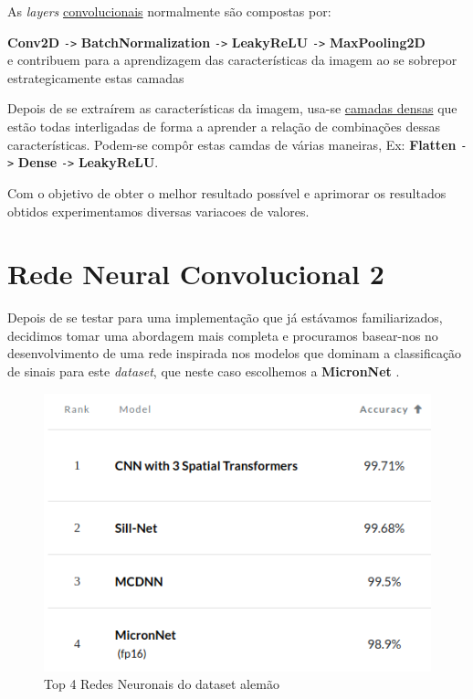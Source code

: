 \documentclass[a4paper]{report}
\begin{document}
As \textit{layers} \underline{convolucionais} normalmente são compostas por:

\textbf{Conv2D} \texttt{->} \textbf{BatchNormalization} \texttt{->} \textbf{LeakyReLU} 
\texttt{->} \textbf{MaxPooling2D} \\
e contribuem para a aprendizagem das características da imagem ao se sobrepor
estrategicamente estas camadas

Depois de se extraírem as características da imagem, usa-se \underline{camadas densas} que
estão todas interligadas de forma a aprender a relação de combinações dessas características.
Podem-se compôr estas camdas de várias maneiras, Ex:
\textbf{Flatten} \texttt{->} \textbf{Dense} \texttt{->} \textbf{LeakyReLU}.

Com o objetivo de obter o melhor resultado possível e aprimorar os resultados obtidos
experimentamos diversas variacoes de valores.

\pagebreak
\section{Rede Neural Convolucional 2}

Depois de se testar para uma implementação que já estávamos familiarizados, decidimos tomar
uma abordagem  mais completa e procuramos basear-nos no
desenvolvimento de uma rede inspirada nos modelos que dominam a classificação de sinais
para este \textit{dataset}, que neste caso escolhemos a \textbf{MicronNet} \cite{wong2018micronnet}.

\begin{figure}[H]
    \centering
    \includegraphics[scale=0.5]{images/top4.png}
    \caption{Top 4 Redes Neuronais do dataset alemão}
\end{figure}
\end{document}
